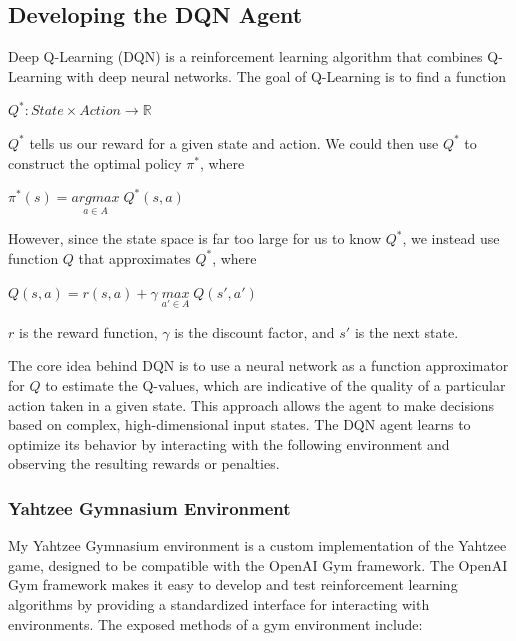 \documentclass[12pt]{article}
\begin{document}
\subsection{Developing the DQN Agent}
Deep Q-Learning (DQN) is a reinforcement learning algorithm that combines Q-Learning with deep neural networks. The goal of Q-Learning is to find a function 

\begin{center}
    $Q^*: State \times Action \rightarrow \mathbb{R}$
\end{center}

\noindent
$Q^*$ tells us our reward for a given state and action. We could then use $Q^*$ to construct the optimal policy $\pi^*$, where

\begin{center}
    $\pi^*(s) = \underset{a \in A}{argmax} \; Q^*(s, a)$
\end{center}

\noindent
However, since the state space is far too large for us to know $Q^*$, we instead use function $Q$ that approximates $Q^*$, where

\begin{center}
    $Q(s, a) = r(s, a) + \gamma \; \underset{a' \in A}{max} \; Q(s', a')$
\end{center}

\noindent
$r$ is the reward function, $\gamma$ is the discount factor, and $s'$ is the next state.

The core idea behind DQN is to use a neural network as a function approximator for $Q$ to estimate the Q-values, which are indicative of the quality of a particular action taken in a given state. This approach allows the agent to make decisions based on complex, high-dimensional input states. The DQN agent learns to optimize its behavior by interacting with the following environment and observing the resulting rewards or penalties.

\subsubsection{Yahtzee Gymnasium Environment}
My Yahtzee Gymnasium environment is a custom implementation of the Yahtzee game, designed to be compatible with the OpenAI Gym framework. The OpenAI Gym framework makes it easy to develop and test reinforcement learning algorithms by providing a standardized interface for interacting with environments. The exposed methods of a gym environment include:
\end{document}
